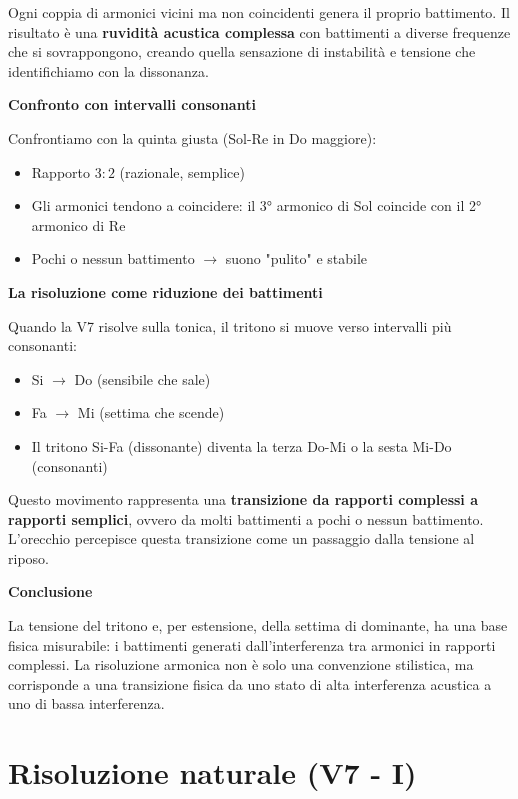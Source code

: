 \begin{fisica}
	Ogni coppia di armonici vicini ma non coincidenti genera il proprio battimento. Il risultato è una \textbf{ruvidità acustica complessa} con battimenti a diverse frequenze che si sovrappongono, creando quella sensazione di instabilità e tensione che identifichiamo con la dissonanza.
	
	\textbf{Confronto con intervalli consonanti}
	
	Confrontiamo con la quinta giusta (Sol-Re in Do maggiore):
	\begin{itemize}
		\item Rapporto $3:2$ (razionale, semplice)
		\item Gli armonici tendono a coincidere: il 3° armonico di Sol coincide con il 2° armonico di Re
		\item Pochi o nessun battimento $\rightarrow$ suono "pulito" e stabile
	\end{itemize}
	
	\textbf{La risoluzione come riduzione dei battimenti}
	
	Quando la V7 risolve sulla tonica, il tritono si muove verso intervalli più consonanti:
	\begin{itemize}
		\item Si $\rightarrow$ Do (sensibile che sale)
		\item Fa $\rightarrow$ Mi (settima che scende)
		\item Il tritono Si-Fa (dissonante) diventa la terza Do-Mi o la sesta Mi-Do (consonanti)
	\end{itemize}
	
	Questo movimento rappresenta una \textbf{transizione da rapporti complessi a rapporti semplici}, ovvero da molti battimenti a pochi o nessun battimento. L'orecchio percepisce questa transizione come un passaggio dalla tensione al riposo.
	
	\textbf{Conclusione}
	
	La tensione del tritono e, per estensione, della settima di dominante, ha una base fisica misurabile: i battimenti generati dall'interferenza tra armonici in rapporti complessi. La risoluzione armonica non è solo una convenzione stilistica, ma corrisponde a una transizione fisica da uno stato di alta interferenza acustica a uno di bassa interferenza.
\end{fisica}

\section{Risoluzione naturale (V7 - I)}
\label{sec:risoluzione_v7}


